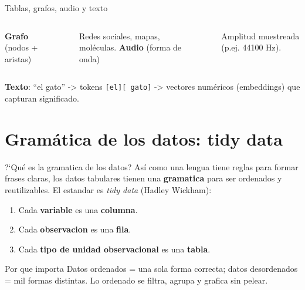 \documentclass[aspectratio=169]{beamer}
\begin{document}
\begin{frame}[fragile]{Tablas, grafos, audio y texto}
  \begin{columns}[t]
      \textbf{Grafo} (nodos + aristas)
      \begin{center}
      \end{center}
      Redes sociales, mapas, mol\'eculas.
      \textbf{Audio} (forma de onda)
      \begin{center}
      \end{center}
      Amplitud muestreada (p.ej. 44100 Hz).
  \end{columns}
  \vspace{0.4em}
  \textbf{Texto}: ``el gato'' -> tokens \texttt{[el][ gato]} -> vectores
  num\'ericos (embeddings) que capturan significado.
\end{frame}

\section{Gram\'atica de los datos: tidy data}

\begin{frame}{?`Qu\'e es la gramatica de los datos?}
  As\'i como una lengua tiene reglas para formar frases claras, los datos
  tabulares tienen una \textbf{gramatica} para ser ordenados y reutilizables.
  El estandar es \emph{tidy data} (Hadley Wickham):
  \begin{enumerate}
    \item Cada \textbf{variable} es una \textbf{columna}.
    \item Cada \textbf{observacion} es una \textbf{fila}.
    \item Cada \textbf{tipo de unidad observacional} es una \textbf{tabla}.
  \end{enumerate}
  \begin{block}{Por que importa}
    Datos ordenados = una sola forma correcta; datos desordenados = mil formas
    distintas. Lo ordenado se filtra, agrupa y grafica sin pelear.
  \end{block}
\end{frame}
\end{document}

